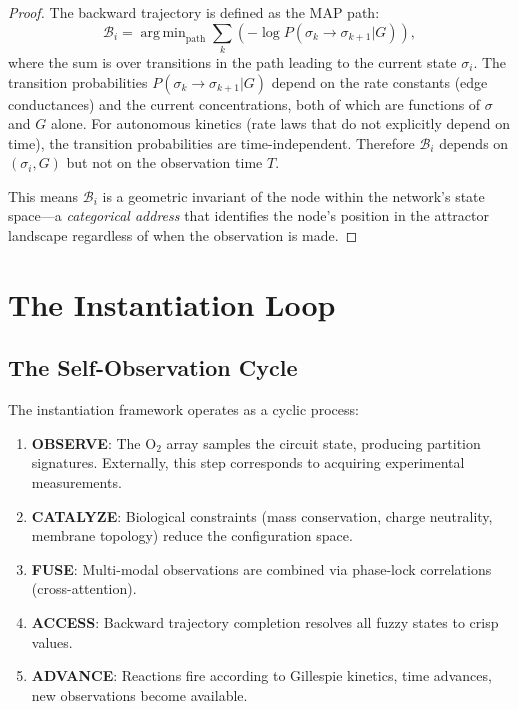 \documentclass[twocolumn,10pt,a4paper]{article}
\theoremstyle{definition}
\theoremstyle{remark}
\newcommand{\Back}{\mathcal{B}}
\DeclareMathOperator*{\argmin}{arg\,min}
\begin{document}
\begin{proof}
The backward trajectory is defined as the MAP path:
\begin{equation}
    \Back_i = \argmin_{\text{path}} \sum_{k} (-\log P(\sigma_k \to \sigma_{k+1} | G)),
\end{equation}
where the sum is over transitions in the path leading to the current state $\sigma_i$. The transition probabilities $P(\sigma_k \to \sigma_{k+1} | G)$ depend on the rate constants (edge conductances) and the current concentrations, both of which are functions of $\sigma$ and $G$ alone. For autonomous kinetics (rate laws that do not explicitly depend on time), the transition probabilities are time-independent. Therefore $\Back_i$ depends on $(\sigma_i, G)$ but not on the observation time $T$.

This means $\Back_i$ is a geometric invariant of the node within the network's state space---a \emph{categorical address} that identifies the node's position in the attractor landscape regardless of when the observation is made.
\end{proof}

\section{The Instantiation Loop}
\label{sec:loop}

\subsection{The Self-Observation Cycle}

The instantiation framework operates as a cyclic process:

\begin{enumerate}[nosep]
    \item \textbf{OBSERVE}: The O$_2$ array samples the circuit state, producing partition signatures. Externally, this step corresponds to acquiring experimental measurements.
    \item \textbf{CATALYZE}: Biological constraints (mass conservation, charge neutrality, membrane topology) reduce the configuration space.
    \item \textbf{FUSE}: Multi-modal observations are combined via phase-lock correlations (cross-attention).
    \item \textbf{ACCESS}: Backward trajectory completion resolves all fuzzy states to crisp values.
    \item \textbf{ADVANCE}: Reactions fire according to Gillespie kinetics, time advances, new observations become available.
\end{enumerate}
\end{document}
